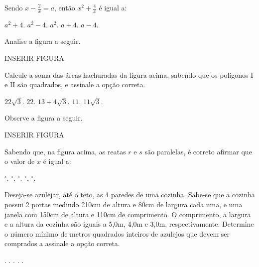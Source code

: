 \begin{question}%
Sendo \(x - \frac{2}{x} = a\), então \(x^2 + \frac{4}{x}\) é igual a:
    \begin{tasks}
        \task \(a^2 + 4\).
        \task \(a^2 - 4\).
        \task \(a^2\).
        \task \(a + 4\).
        \task \(a - 4\).
    \end{tasks}
\end{question}

\begin{question}%
Analise a figura a seguir.

INSERIR FIGURA

Calcule a soma das áreas hachuradas da figura acima, sabendo que os polígonos I e II são quadrados, e assinale a opção correta.
    \begin{tasks}
        \task \(22\sqrt{3}\).
        \task \(22\).
        \task \(13 + 4\sqrt{3}\).
        \task \(11\).
        \task \(11\sqrt{3}\).
    \end{tasks}
\end{question}

\begin{question}%
Observe a figura a seguir.

INSERIR FIGURA

Sabendo que, na figura acima, as reatas \(r\) e \(s\) são paralelas, é correto afirmar que o valor de \(x\) é igual a:
    \begin{tasks}
        \(^\circ\).
        \(^\circ\).
        \(^\circ\).
        \(^\circ\).
        \(^\circ\).
    \end{tasks}
\end{question}

\begin{question}%
Deseja-se azulejar, até o teto, as 4 paredes de uma cozinha. Sabe-se que a cozinha possui 2 portas medindo 210cm de altura e 80cm de largura cada uma, e uma janela com 150cm de altura e 110cm de comprimento. O comprimento, a largura e a altura da cozinha são iguais a 5,0m, 4,0m e 3,0m, respectivamente. Determine o número mínimo de metros quadrados inteiros de azulejos que devem ser comprados a assinale a opção correta.
    \begin{tasks}
        .
        .
        .
        .
        .
    \end{tasks}
\end{question}


